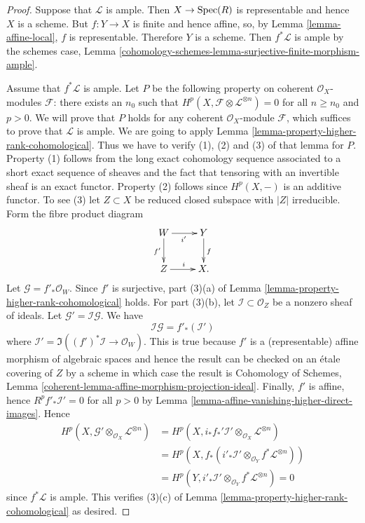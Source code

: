 \begin{proof}
  Suppose that $\mathcal{L}$ is ample.
  Then $X \to \mathop{\rm Spec}(R)$ is representable and hence $X$ is a scheme.
  But $f : Y \to X$ is finite and hence affine, so, by
  Lemma \ref{lemma-affine-local}, $f$ is representable.
  Therefore $Y$ is a scheme.
  Then $f^*\mathcal{L}$ is ample by the schemes case,
  Lemma \ref{cohomology-schemes-lemma-surjective-finite-morphism-ample}.

\medskip\noindent
Assume that $f^*\mathcal{L}$ is ample.
Let $P$ be the following property on coherent $\mathcal{O}_X$-modules
$\mathcal{F}$:
there exists an $n_0$ such that $H^p(X, \mathcal{F} \otimes
\mathcal{L}^{\otimes n}) = 0$ for all $n \geq n_0$ and $p > 0$.
We will prove that $P$ holds for any coherent $\mathcal{O}_X$-module
$\mathcal{F}$, which suffices to prove that $\mathcal{L}$ is ample.
We are going to apply Lemma \ref{lemma-property-higher-rank-cohomological}.
Thus we have to verify (1), (2) and (3) of that lemma for $P$.
Property (1) follows from the long exact cohomology sequence associated
to a short exact sequence of sheaves and the fact that tensoring with
an invertible sheaf is an exact functor.
Property (2) follows since $H^p(X, -)$ is an additive functor.
To see (3) let $Z \subset X$ be reduced closed subspace with $|Z|$
irreducible.
Form the fibre product diagram
$$
\xymatrix{
  W \ar[r]_{i'} \ar[d]_{f'} & Y \ar[d]^{f} \\
  Z \ar[r]^{i} & X.
}
$$
Let $\mathcal{G} = f'_*\mathcal{O}_W$.
Since $f'$ is surjective, part (3)(a) of Lemma
\ref{lemma-property-higher-rank-cohomological} holds.
For part (3)(b), let $\mathcal{I} \subset \mathcal{O}_Z$ be a nonzero sheaf
of ideals.
Let $\mathcal{G}' = \mathcal{I}\mathcal{G}$.
We have
$$
\mathcal{I} \mathcal{G} = f'_*(\mathcal{I}')
$$
where $\mathcal{I}' = \Im((f')^*\mathcal{I} \to \mathcal{O}_W)$.
This is true because $f'$ is a (representable) affine morphism of
algebraic spaces and hence the result can be checked on an \'etale
covering of $Z$ by a scheme in which case the result is
Cohomology of Schemes, Lemma
\ref{coherent-lemma-affine-morphism-projection-ideal}.
Finally, $f'$ is affine, hence $R^pf'_*\mathcal{I}' = 0$ for all $p > 0$ by
Lemma \ref{lemma-affine-vanishing-higher-direct-images}.
Hence
\begin{align*}
H^p(X, \mathcal{G}' \otimes_{\mathcal{O}_X} \mathcal{L}^{\otimes n})
  & = H^p(X, i_*f_*'\mathcal{I}' \otimes_{\mathcal{O}_X} \mathcal{L}^{\otimes n}) \\
  & = H^p(X, f_*(i'_*\mathcal{I}' \otimes_{\mathcal{O}_Y} f^*\mathcal{L}^{\otimes n})) \\
  & = H^p(Y, i'_*\mathcal{I}' \otimes_{\mathcal{O}_Y} f^*\mathcal{L}^{\otimes n}) = 0
\end{align*}
since $f^*\mathcal{L}$ is ample.
This verifies (3)(c) of Lemma \ref{lemma-property-higher-rank-cohomological} as
desired.
\end{proof}

